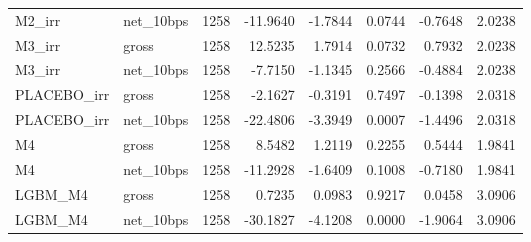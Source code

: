 \begin{tabular}{llrrrrrr}
M2\_irr & net\_10bps & 1258 & -11.9640 & -1.7844 & 0.0744 & -0.7648 & 2.0238 \\
M3\_irr & gross & 1258 & 12.5235 & 1.7914 & 0.0732 & 0.7932 & 2.0238 \\
M3\_irr & net\_10bps & 1258 & -7.7150 & -1.1345 & 0.2566 & -0.4884 & 2.0238 \\
PLACEBO\_irr & gross & 1258 & -2.1627 & -0.3191 & 0.7497 & -0.1398 & 2.0318 \\
PLACEBO\_irr & net\_10bps & 1258 & -22.4806 & -3.3949 & 0.0007 & -1.4496 & 2.0318 \\
M4 & gross & 1258 & 8.5482 & 1.2119 & 0.2255 & 0.5444 & 1.9841 \\
M4 & net\_10bps & 1258 & -11.2928 & -1.6409 & 0.1008 & -0.7180 & 1.9841 \\
LGBM\_M4 & gross & 1258 & 0.7235 & 0.0983 & 0.9217 & 0.0458 & 3.0906 \\
LGBM\_M4 & net\_10bps & 1258 & -30.1827 & -4.1208 & 0.0000 & -1.9064 & 3.0906 \\
\bottomrule
\end{tabular}
